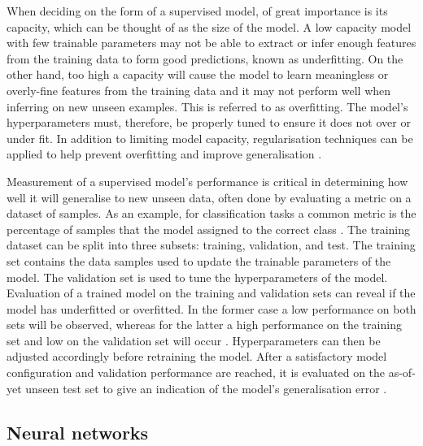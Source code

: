 \documentclass[12pt]{article}
\begin{document}
When deciding on the form of a supervised model, of great importance is its capacity, which can be thought of as the size of the model. A low capacity model with few trainable parameters may not be able to extract or infer enough features from the training data to form good predictions, known as underfitting. On the other hand, too high a capacity will cause the model to learn meaningless or overly-fine features from the training data and it may not perform well when inferring on new unseen examples. This is referred to as overfitting. The model's hyperparameters must, therefore, be properly tuned to ensure it does not over or under fit. In addition to limiting model capacity, regularisation techniques can be applied to help prevent overfitting and improve generalisation \cite{Murphy12, Goodfellow16}.

Measurement of a supervised model's performance is critical in determining how well it will generalise to new unseen data, often done by evaluating a metric on a dataset of samples. As an example, for classification tasks a common metric is the percentage of samples that the model assigned to the correct class \cite{Murphy12}. The training dataset can be split into three subsets: training, validation, and test. The training set contains the data samples used to update the trainable parameters of the model. The validation set is used to tune the hyperparameters of the model. Evaluation of a trained model on the training and validation sets can reveal if the model has underfitted or overfitted. In the former case a low performance on both sets will be observed, whereas for the latter a high performance on the training set and low on the validation set will occur \cite{Murphy12, Goodfellow16}. Hyperparameters can then be adjusted accordingly before retraining the model. After a satisfactory model configuration and validation performance are reached, it is evaluated on the as-of-yet unseen test set to give an indication of the model's generalisation error \cite{Murphy12, Goodfellow16}.

\subsection{Neural networks}
\end{document}
